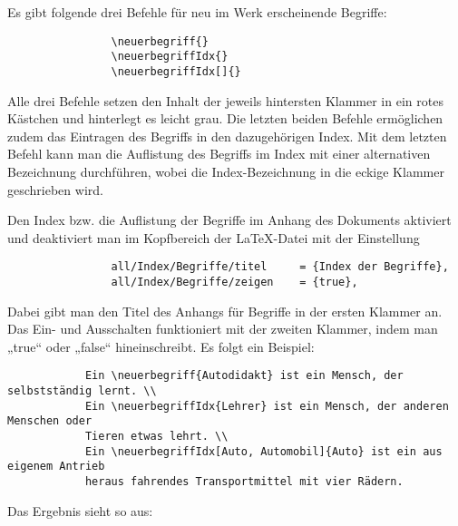 			Es gibt folgende drei Befehle für neu im Werk erscheinende Begriffe: 
			
			\begin{verbatim}
				\neuerbegriff{}
				\neuerbegriffIdx{}
				\neuerbegriffIdx[]{}
			\end{verbatim}\newline
			
			Alle drei Befehle setzen den Inhalt der jeweils hintersten Klammer in ein rotes Kästchen und hinterlegt es leicht grau. Die letzten beiden Befehle ermöglichen zudem das Eintragen des Begriffs in den dazugehörigen Index. Mit dem letzten Befehl kann man die Auflistung des Begriffs im Index mit einer alternativen Bezeichnung durchführen, wobei die Index-Bezeichnung in die eckige Klammer geschrieben wird.
			
			Den Index bzw. die Auflistung der Begriffe im Anhang des Dokuments aktiviert und deaktiviert man im Kopfbereich der \LaTeX{}-Datei mit der Einstellung 
			
			\begin{verbatim}
				all/Index/Begriffe/titel     = {Index der Begriffe},
				all/Index/Begriffe/zeigen    = {true},
			\end{verbatim}\newline
			
			Dabei gibt man den Titel des Anhangs für Begriffe in der ersten Klammer an. Das Ein- und Ausschalten funktioniert mit der zweiten Klammer, indem man „true“ oder „false“ hineinschreibt. Es folgt ein Beispiel: 
			
			\begin{verbatim}
			Ein \neuerbegriff{Autodidakt} ist ein Mensch, der selbstständig lernt. \\
			Ein \neuerbegriffIdx{Lehrer} ist ein Mensch, der anderen Menschen oder 
			Tieren etwas lehrt. \\
			Ein \neuerbegriffIdx[Auto, Automobil]{Auto} ist ein aus eigenem Antrieb 
			heraus fahrendes Transportmittel mit vier Rädern. 
			\end{verbatim}\newline
			
			Das Ergebnis sieht so aus: \\
			
			\newline
				

